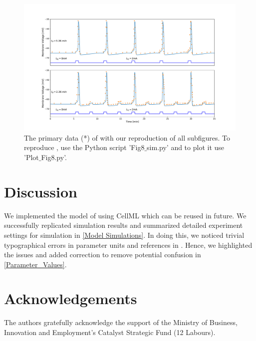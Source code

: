 \documentclass[fleqn,10pt]{physiome}
\begin{document}
\begin{figure}[ht!]%
\includegraphics[width=1.0\linewidth]{Figure_8.pdf}
\caption{The primary data (*) of \cite[Figure 8A]{imtiaz2002theoretical} with our reproduction of all subfigures. To reproduce \cite[Figure 8A]{imtiaz2002theoretical}, use the Python script 'Fig8$\_$sim.py' and to plot it use 'Plot$\_$Fig8.py'.}
\label{fig:fig8}
\end{figure}
\section{Discussion}
We implemented the model of \cite{imtiaz2002theoretical} using CellML which can be reused in future. We successfully replicated simulation results and summarized detailed experiment settings for simulation in \autoref{Model Simulations}.
In doing this, we noticed trivial typographical errors in parameter units and references in \cite[Table 1, 3]{imtiaz2002theoretical}. Hence, we highlighted the issues and added correction to remove potential confusion in \autoref{Parameter_Values}.

\section{Acknowledgements}
The authors gratefully acknowledge the support of the Ministry of Business, Innovation and Employment’s
Catalyst Strategic Fund (12 Labours).


\end{document}
